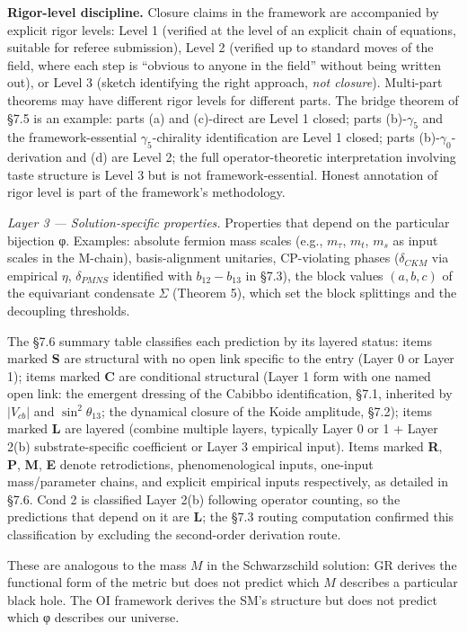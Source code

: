 \documentclass[
]{article}
\begin{document}
\textbf{Rigor-level discipline.} Closure claims in the framework are
accompanied by explicit rigor levels: Level 1 (verified at the level of
an explicit chain of equations, suitable for referee submission), Level
2 (verified up to standard moves of the field, where each step is
``obvious to anyone in the field'' without being written out), or Level
3 (sketch identifying the right approach, \emph{not closure}).
Multi-part theorems may have different rigor levels for different parts.
The bridge theorem of §7.5 is an example: parts (a) and (c)-direct are
Level 1 closed; parts (b)-\(\gamma_5\) and the framework-essential
\(\gamma_5\)-chirality identification are Level 1 closed; parts
(b)-\(\gamma_0\)-derivation and (d) are Level 2; the full
operator-theoretic interpretation involving taste structure is Level 3
but is not framework-essential. Honest annotation of rigor level is part
of the framework's methodology.

\emph{Layer 3 --- Solution-specific properties.} Properties that depend
on the particular bijection φ. Examples: absolute fermion mass scales
(e.g., \(m_\tau\), \(m_t\), \(m_s\) as input scales in the M-chain),
basis-alignment unitaries, CP-violating phases (\(\delta_{CKM}\) via
empirical \(\eta\), \(\delta_{PMNS}\) identified with
\(b_{12} - b_{13}\) in §7.3), the block values \((a, b, c)\) of the
equivariant condensate \(\Sigma\) (Theorem 5), which set the block
splittings and the decoupling thresholds.

The §7.6 summary table classifies each prediction by its layered status:
items marked \textbf{S} are structural with no open link specific to the
entry (Layer 0 or Layer 1); items marked \textbf{C} are conditional
structural (Layer 1 form with one named open link: the emergent dressing
of the Cabibbo identification, §7.1, inherited by \(|V_{cb}|\) and
\(\sin^2\theta_{13}\); the dynamical closure of the Koide amplitude,
§7.2); items marked \textbf{L} are layered (combine multiple layers,
typically Layer 0 or 1 + Layer 2(b) substrate-specific coefficient or
Layer 3 empirical input). Items marked \textbf{R}, \textbf{P},
\textbf{M}, \textbf{E} denote retrodictions, phenomenological inputs,
one-input mass/parameter chains, and explicit empirical inputs
respectively, as detailed in §7.6. Cond 2 is classified Layer 2(b)
following operator counting, so the predictions that depend on it are
\textbf{L}; the §7.3 routing computation confirmed this classification
by excluding the second-order derivation route.

These are analogous to the mass \(M\) in the Schwarzschild solution: GR
derives the functional form of the metric but does not predict which
\(M\) describes a particular black hole. The OI framework derives the
SM's structure but does not predict which φ describes our universe.
\end{document}
